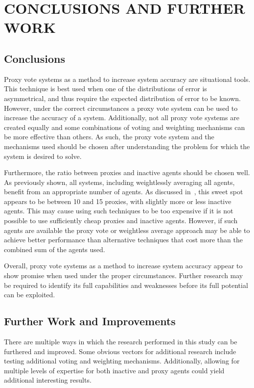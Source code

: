 %
%

\chapter{CONCLUSIONS AND FURTHER WORK}\label{ch:conclusions-and-further-work}

\section{Conclusions}\label{sec:conclusions}
Proxy vote systems as a method to increase system accuracy are situational tools.
This technique is best used when one of the distributions of error is asymmetrical,
and thus require the expected distribution of error to be known.
However, under the correct circumstances a proxy vote system can be used to increase
the accuracy of a system.
Additionally, not all proxy vote systems are created equally and some combinations of
voting and weighting mechanisms can be more effective than others.
As such, the proxy vote system and the mechanisms used should be chosen after
understanding the problem for which the system is desired to solve.

Furthermore, the ratio between proxies and inactive agents should be chosen well.
As previously shown, all systems, including weightlessly averaging all agents, benefit
from an appropriate number of agents.
As discussed in~, this sweet spot appears to be between
10 and 15 proxies, with slightly more or less inactive agents.
This may cause using such techniques to be too expensive if it is not possible to use
sufficiently cheap proxies and inactive agents.
However, if such agents are available the proxy vote or weightless average approach
may be able to achieve better performance than alternative techniques that cost more
than the combined sum of the agents used.

Overall, proxy vote systems as a method to increase system accuracy appear to show
promise when used under the proper circumstances.
Further research may be required to identify its full capabilities and weaknesses
before its full potential can be exploited.

\section{Further Work and Improvements}\label{sec:further-work-and-improvements}
There are multiple ways in which the research performed in this study can be
furthered and improved.
Some obvious vectors for additional research include testing additional voting and
weighting mechanisms.
Additionally, allowing for multiple levels of expertise for both inactive and proxy
agents could yield additional interesting results.

